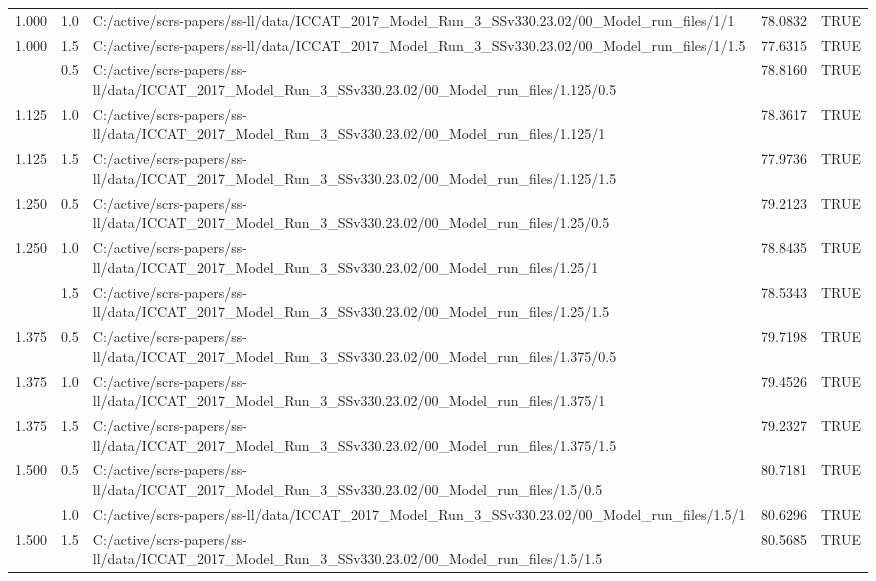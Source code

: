 \begin{table}
\begin{tabular}[t]{rrlrl}
1.000 & 1.0 & C:/active/scrs-papers/ss-ll/data/ICCAT\_2017\_Model\_Run\_3\_SSv330.23.02/00\_Model\_run\_files/1/1 & 78.0832 & TRUE\\
1.000 & 1.5 & C:/active/scrs-papers/ss-ll/data/ICCAT\_2017\_Model\_Run\_3\_SSv330.23.02/00\_Model\_run\_files/1/1.5 & 77.6315 & TRUE\\
\addlinespace
1.125 & 0.5 & C:/active/scrs-papers/ss-ll/data/ICCAT\_2017\_Model\_Run\_3\_SSv330.23.02/00\_Model\_run\_files/1.125/0.5 & 78.8160 & TRUE\\
1.125 & 1.0 & C:/active/scrs-papers/ss-ll/data/ICCAT\_2017\_Model\_Run\_3\_SSv330.23.02/00\_Model\_run\_files/1.125/1 & 78.3617 & TRUE\\
1.125 & 1.5 & C:/active/scrs-papers/ss-ll/data/ICCAT\_2017\_Model\_Run\_3\_SSv330.23.02/00\_Model\_run\_files/1.125/1.5 & 77.9736 & TRUE\\
1.250 & 0.5 & C:/active/scrs-papers/ss-ll/data/ICCAT\_2017\_Model\_Run\_3\_SSv330.23.02/00\_Model\_run\_files/1.25/0.5 & 79.2123 & TRUE\\
1.250 & 1.0 & C:/active/scrs-papers/ss-ll/data/ICCAT\_2017\_Model\_Run\_3\_SSv330.23.02/00\_Model\_run\_files/1.25/1 & 78.8435 & TRUE\\
\addlinespace
1.250 & 1.5 & C:/active/scrs-papers/ss-ll/data/ICCAT\_2017\_Model\_Run\_3\_SSv330.23.02/00\_Model\_run\_files/1.25/1.5 & 78.5343 & TRUE\\
1.375 & 0.5 & C:/active/scrs-papers/ss-ll/data/ICCAT\_2017\_Model\_Run\_3\_SSv330.23.02/00\_Model\_run\_files/1.375/0.5 & 79.7198 & TRUE\\
1.375 & 1.0 & C:/active/scrs-papers/ss-ll/data/ICCAT\_2017\_Model\_Run\_3\_SSv330.23.02/00\_Model\_run\_files/1.375/1 & 79.4526 & TRUE\\
1.375 & 1.5 & C:/active/scrs-papers/ss-ll/data/ICCAT\_2017\_Model\_Run\_3\_SSv330.23.02/00\_Model\_run\_files/1.375/1.5 & 79.2327 & TRUE\\
1.500 & 0.5 & C:/active/scrs-papers/ss-ll/data/ICCAT\_2017\_Model\_Run\_3\_SSv330.23.02/00\_Model\_run\_files/1.5/0.5 & 80.7181 & TRUE\\
\addlinespace
1.500 & 1.0 & C:/active/scrs-papers/ss-ll/data/ICCAT\_2017\_Model\_Run\_3\_SSv330.23.02/00\_Model\_run\_files/1.5/1 & 80.6296 & TRUE\\
1.500 & 1.5 & C:/active/scrs-papers/ss-ll/data/ICCAT\_2017\_Model\_Run\_3\_SSv330.23.02/00\_Model\_run\_files/1.5/1.5 & 80.5685 & TRUE\\
\bottomrule
\end{tabular}
\end{table}

